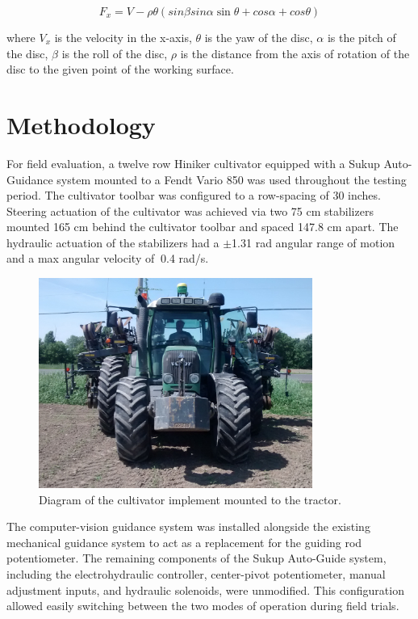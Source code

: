 \documentclass[authoryear]{elsarticle}
\begin{document}
\begin{equation}
  F_x = V - \rho\theta(sin \beta sin \alpha \sin \theta + cos \alpha +
  cos \theta)
  \label{eq:horizontal_force}
\end{equation}
\begin{flushleft}
where $V_x$ is the velocity in the x-axis, $\theta$ is the yaw of the
disc, $\alpha$ is the pitch of the
disc, $\beta$ is the roll of the disc, $\rho$ is the distance from
the axis of rotation of the disc to the given point of the working surface.
\end{flushleft}

\section{Methodology}
For field evaluation, a twelve row Hiniker cultivator equipped with a
Sukup Auto-Guidance system mounted to a Fendt Vario 850 was used
throughout the testing period. The cultivator toolbar was configured
to a row-spacing of 30 inches. Steering actuation of the cultivator
was achieved via two 75 cm stabilizers mounted 165 cm behind the
cultivator toolbar and spaced 147.8 cm apart. The hydraulic actuation
of the stabilizers had a $\pm$1.31 rad angular range of
motion and a max angular velocity of $~$0.4 rad/s.

\begin{figure}[H]
  \centering
  \includegraphics[width=0.8\textwidth,natwidth=610,natheight=642]{fendt_front.jpg}
  \caption{Diagram of the cultivator implement mounted to the tractor.}
\end{figure}

The computer-vision guidance system was installed alongside the
existing mechanical guidance system to act as a replacement for the
guiding rod potentiometer. The remaining components of the Sukup
Auto-Guide system, including the electrohydraulic controller,
center-pivot potentiometer, manual adjustment inputs, and hydraulic
solenoids, were unmodified. This configuration allowed easily
switching between the two modes of operation during field trials.
\end{document}
